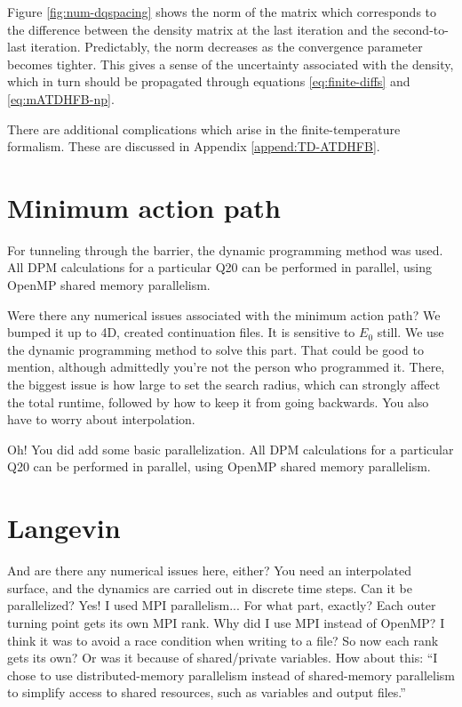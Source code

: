 Figure \ref{fig:num-dqspacing} shows the norm of the matrix which corresponds to the difference between the density matrix at the last iteration and the second-to-last iteration. Predictably, the norm decreases as the convergence parameter becomes tighter. This gives a sense of the uncertainty associated with the density, which in turn should be propagated through equations \ref{eq:finite-diffs} and \ref{eq:mATDHFB-np}.

There are additional complications which arise in the finite-temperature formalism. These are discussed in Appendix \ref{append:TD-ATDHFB}.

\section{Minimum action path}
For tunneling through the barrier, the dynamic programming method \cite{Baran1981} was used. All DPM calculations for a particular Q20 can be performed in parallel, using OpenMP shared memory parallelism.

Were there any numerical issues associated with the minimum action path? We bumped it up to 4D, created continuation files. It is sensitive to $E_0$ still. We use the dynamic programming method to solve this part. That could be good to mention, although admittedly you're not the person who programmed it. There, the biggest issue is how large to set the search radius, which can strongly affect the total runtime, followed by how to keep it from going backwards. You also have to worry about interpolation.

Oh! You did add some basic parallelization. All DPM calculations for a particular Q20 can be performed in parallel, using OpenMP shared memory parallelism.

\section{Langevin}
And are there any numerical issues here, either? You need an interpolated surface, and the dynamics are carried out in discrete time steps. Can it be parallelized? Yes! I used MPI parallelism... For what part, exactly? Each outer turning point gets its own MPI rank. Why did I use MPI instead of OpenMP? I think it was to avoid a race condition when writing to a file? So now each rank gets its own? Or was it because of shared/private variables. How about this: ``I chose to use distributed-memory parallelism instead of shared-memory parallelism to simplify access to shared resources, such as variables and output files.''